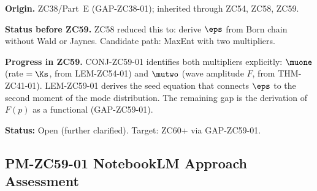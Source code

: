 \documentclass[12pt, a4paper]{article}
\begin{document}
\begin{openqbox}[title={GAP-ZC54-01: Jaynes K20 from Axioms
  (Inherited Open --- Further Clarified)}]
\textbf{Origin.} ZC38/Part~E (GAP-ZC38-01); inherited through
ZC54, ZC58, ZC59.

\textbf{Status before ZC59.}
ZC58 reduced this to: derive $\eps$ from Born chain without
Wald or Jaynes.  Candidate path: MaxEnt with two multipliers.

\textbf{Progress in ZC59.}
CONJ-ZC59-01 identifies both multipliers explicitly:
$\muone$ (rate $= \Ks$, from LEM-ZC54-01) and $\mutwo$
(wave amplitude $F$, from THM-ZC41-01).  LEM-ZC59-01 derives
the seed equation that connects $\eps$ to the second moment
of the mode distribution.  The remaining gap is the derivation
of $F(p)$ as a functional (GAP-ZC59-01).

\textbf{Status:} Open (further clarified).  Target: ZC60+
via GAP-ZC59-01.
\end{openqbox}

\subsection{PM-ZC59-01 \quad NotebookLM Approach Assessment}
\label{sec:pm}
\end{document}
